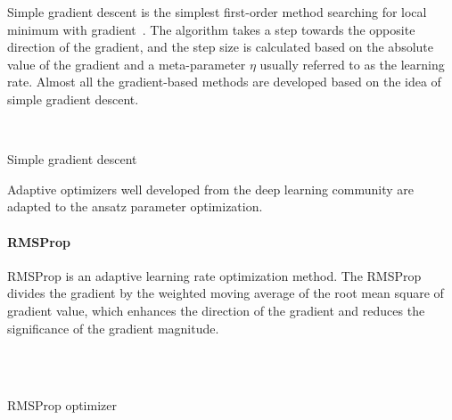 Simple gradient descent is the simplest first-order method searching for local minimum with gradient~\cite{Lemarechal12cauchyand,Courant1943Variational}. The algorithm takes a step towards the opposite direction of the gradient, and the step size is calculated based on the absolute value of the gradient and a meta-parameter $\eta$ usually referred to as the learning rate. Almost all the gradient-based methods are developed based on the idea of simple gradient descent. 

\vspace{0.5cm}

\begin{algorithm}[H]
\SetAlgoNoLine%
\\
\caption{Simple gradient descent}
\end{algorithm}


Adaptive optimizers well developed from the deep learning community are adapted to the ansatz parameter optimization. %

\paragraph{RMSProp}
RMSProp is an adaptive learning rate optimization method. The RMSProp divides the gradient by the weighted moving average of the root mean square of gradient value, which enhances the direction of the gradient and reduces the significance of the gradient magnitude.  


\vspace{0.5cm}

\begin{algorithm}[H]
\SetAlgoNoLine%
\\
\\
\caption{RMSProp optimizer}
\end{algorithm}


